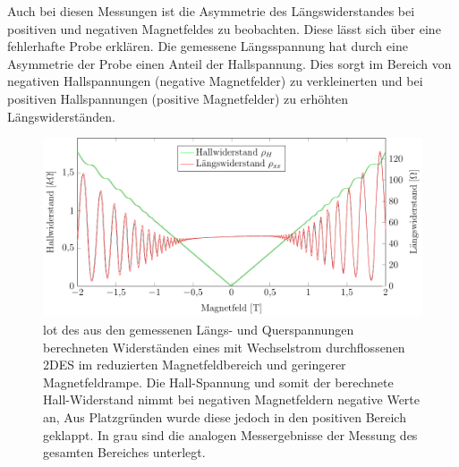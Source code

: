 Auch bei diesen Messungen ist die Asymmetrie des Längswiderstandes bei positiven und negativen Magnetfeldes zu beobachten. Diese lässt sich über eine fehlerhafte Probe erklären. Die gemessene Längsspannung hat durch eine Asymmetrie der Probe einen Anteil der Hallspannung. Dies sorgt im Bereich von negativen Hallspannungen (negative Magnetfelder) zu verkleinerten und bei positiven Hallspannungen (positive Magnetfelder) zu erhöhten Längswiderständen.


\begin{figure}[h]
	\centering
	\includegraphics{graphs/ac/pm2T_range.pdf}
	\caption[Höher aufgelöste Gleichstrommessung in Magnetfeldteilbereich]{
		lot des aus den gemessenen Längs- und Querspannungen berechneten Widerständen eines mit Wechselstrom durchflossenen 2DES im reduzierten Magnetfeldbereich und geringerer Magnetfeldrampe. Die Hall-Spannung und somit der berechnete Hall-Widerstand nimmt bei negativen Magnetfeldern negative Werte an, Aus Platzgründen wurde diese jedoch in den positiven Bereich geklappt. In grau sind die analogen Messergebnisse der Messung des gesamten Bereiches unterlegt.
	}
	\label{fig:2T_range_ac}
\end{figure}

